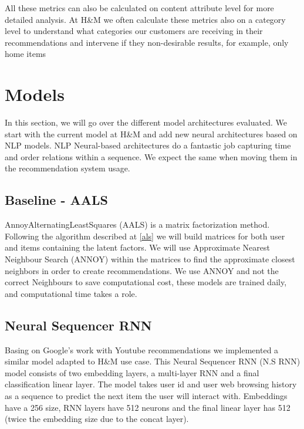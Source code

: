 \documentclass{kththesis}
\begin{document}
All these metrics can also be calculated on content attribute level for more detailed analysis. At H\&M we often calculate these metrics also on a category level to understand what categories our customers are receiving in their recommendations and intervene if they non-desirable results, for example, only home items 


\chapter{Models}
In this section, we will go over the different model architectures evaluated. We start with the current model at H\&M and add new neural architectures based on NLP models. NLP Neural-based architectures do a fantastic job capturing time and order relations within a sequence. We expect the same when moving them in the recommendation system usage.

\section{Baseline - AALS}
AnnoyAlternatingLeastSquares (AALS) is a matrix factorization method. Following the algorithm described at \ref{als} we will build matrices for both user and items containing the latent factors. We will use Approximate Nearest Neighbour Search \cite{annoy} (ANNOY) within the matrices to find the approximate closest neighbors in order to create recommendations. We use ANNOY and not the correct Neighbours to save computational cost, these models are trained daily, and computational time takes a role.


\section{Neural Sequencer RNN}
Basing on Google's work with Youtube recommendations \cite{rnn-youtube} we implemented a similar model adapted to H\&M use case. This Neural Sequencer RNN (N.S RNN) model consists of two embedding layers, a multi-layer RNN and a final classification linear layer. The model takes user id and user web browsing history as a sequence to predict the next item the user will interact with. Embeddings have a 256 size, RNN layers have 512 neurons and the final linear layer has 512 (twice the embedding size due to the concat layer). 
\end{document}
